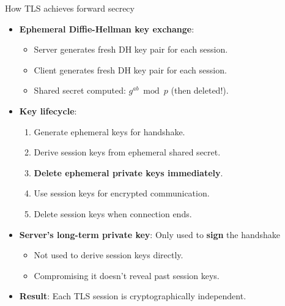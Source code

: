 \documentclass[aspectratio=169, lualatex, handout]{beamer}
\begin{document}
\begin{frame}{How TLS achieves forward secrecy}
	\begin{itemize}[<+->]
		\item \textbf{Ephemeral Diffie-Hellman key exchange}:
		      \begin{itemize}
			      \item Server generates fresh DH key pair for each session.
			      \item Client generates fresh DH key pair for each session.
			      \item Shared secret computed: $g^{ab} \bmod p$ (then deleted!).
		      \end{itemize}
		\item \textbf{Key lifecycle}:
		      \begin{enumerate}
			      \item Generate ephemeral keys for handshake.
			      \item Derive session keys from ephemeral shared secret.
			      \item \textbf{Delete ephemeral private keys immediately}.
			      \item Use session keys for encrypted communication.
			      \item Delete session keys when connection ends.
		      \end{enumerate}
		\item \textbf{Server's long-term private key}: Only used to \textbf{sign} the handshake
		      \begin{itemize}
			      \item Not used to derive session keys directly.
			      \item Compromising it doesn't reveal past session keys.
		      \end{itemize}
		\item \textbf{Result}: Each TLS session is cryptographically independent.
	\end{itemize}
\end{frame}
\end{document}
